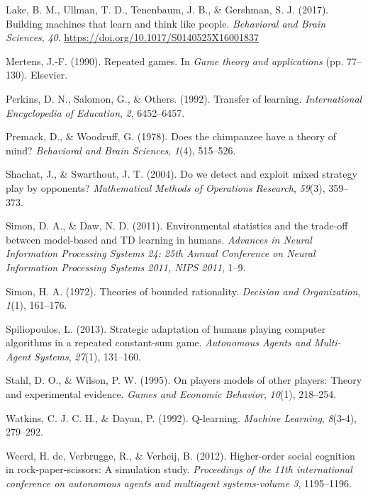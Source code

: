 \documentclass[man,floatsintext]{apa6}
\begin{document}
\leavevmode\hypertarget{ref-Lake2017}{}%
Lake, B. M., Ullman, T. D., Tenenbaum, J. B., \& Gershman, S. J. (2017). Building machines that learn and think like people. \emph{Behavioral and Brain Sciences}, \emph{40}. \url{https://doi.org/10.1017/S0140525X16001837}

\leavevmode\hypertarget{ref-mertens1990repeated}{}%
Mertens, J.-F. (1990). Repeated games. In \emph{Game theory and applications} (pp. 77--130). Elsevier.

\leavevmode\hypertarget{ref-perkins1992transfer}{}%
Perkins, D. N., Salomon, G., \& Others. (1992). Transfer of learning. \emph{International Encyclopedia of Education}, \emph{2}, 6452--6457.

\leavevmode\hypertarget{ref-premack1978does}{}%
Premack, D., \& Woodruff, G. (1978). Does the chimpanzee have a theory of mind? \emph{Behavioral and Brain Sciences}, \emph{1}(4), 515--526.

\leavevmode\hypertarget{ref-shachat2004we}{}%
Shachat, J., \& Swarthout, J. T. (2004). Do we detect and exploit mixed strategy play by opponents? \emph{Mathematical Methods of Operations Research}, \emph{59}(3), 359--373.

\leavevmode\hypertarget{ref-Simon_Daw_11}{}%
Simon, D. A., \& Daw, N. D. (2011). Environmental statistics and the trade-off between model-based and TD learning in humans. \emph{Advances in Neural Information Processing Systems 24: 25th Annual Conference on Neural Information Processing Systems 2011, NIPS 2011}, 1--9.

\leavevmode\hypertarget{ref-simon1972theories}{}%
Simon, H. A. (1972). Theories of bounded rationality. \emph{Decision and Organization}, \emph{1}(1), 161--176.

\leavevmode\hypertarget{ref-spiliopoulos2013strategic}{}%
Spiliopoulos, L. (2013). Strategic adaptation of humans playing computer algorithms in a repeated constant-sum game. \emph{Autonomous Agents and Multi-Agent Systems}, \emph{27}(1), 131--160.

\leavevmode\hypertarget{ref-stahl1995players}{}%
Stahl, D. O., \& Wilson, P. W. (1995). On players models of other players: Theory and experimental evidence. \emph{Games and Economic Behavior}, \emph{10}(1), 218--254.

\leavevmode\hypertarget{ref-watkins1992q}{}%
Watkins, C. J. C. H., \& Dayan, P. (1992). Q-learning. \emph{Machine Learning}, \emph{8}(3-4), 279--292.

\leavevmode\hypertarget{ref-de2012higher}{}%
Weerd, H. de, Verbrugge, R., \& Verheij, B. (2012). Higher-order social cognition in rock-paper-scissors: A simulation study. \emph{Proceedings of the 11th international conference on autonomous agents and multiagent systems-volume 3}, 1195--1196.
\end{document}
